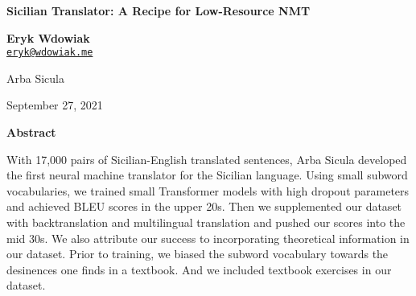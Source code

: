 \documentclass[10pt,letterpaper]{article}
\newenvironment{absmarg}{
  \begingroup
    \fontsize{10pt}{11pt}\selectfont
}{
  \par
  \endgroup
}
\begin{document}

\thispagestyle{empty}



\vspace*{0em}
\begin{center}
  {\Large{\textbf{Sicilian Translator: A Recipe for Low-Resource NMT}}}

  {\large{\textbf{Eryk Wdowiak}}}\\ %
  \href{mailto:eryk@wdowiak.me}{\texttt{eryk@wdowiak.me}}
  
  {\large{Arba Sicula}}%
  
  September 27, 2021
\end{center}


\begin{center}
  \textbf{Abstract}
\end{center}

\vspace{-1.5em}
\begin{adjustwidth}{0.5in}{0.5in}
\begin{absmarg} 
  With 17,000 pairs of Sicilian-English translated sentences,
  Arba Sicula developed the first neural machine translator for the Sicilian language.
  Using small subword vocabularies, we trained small Transformer models
  with high dropout parameters and achieved BLEU scores in the upper 20s.
  Then we supplemented our dataset with backtranslation and multilingual
  translation and pushed our scores into the mid 30s.
  We also attribute our success to incorporating theoretical information in our dataset.
  Prior to training, we biased the subword vocabulary towards the desinences one finds in a textbook.
  And we included textbook exercises in our dataset.
\end{absmarg}
\end{adjustwidth}
\end{document}
